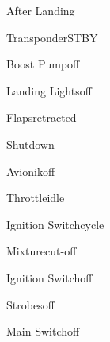 \begin{checklist}{After Landing}
  \item{Transponder}{STBY}
  \item{Boost Pump}{off}
  \item{Landing Lights}{off}
  \item{Flaps}{retracted}
\end{checklist}

\begin{checklist}{Shutdown}
  \item{Avionik}{off}
  \item{Throttle}{idle}
  \item{Ignition Switch}{cycle}
  \item{Mixture}{cut-off}
  \item{Ignition Switch}{off}
  \item{Strobes}{off}
  \item{Main Switch}{off}
\end{checklist}

